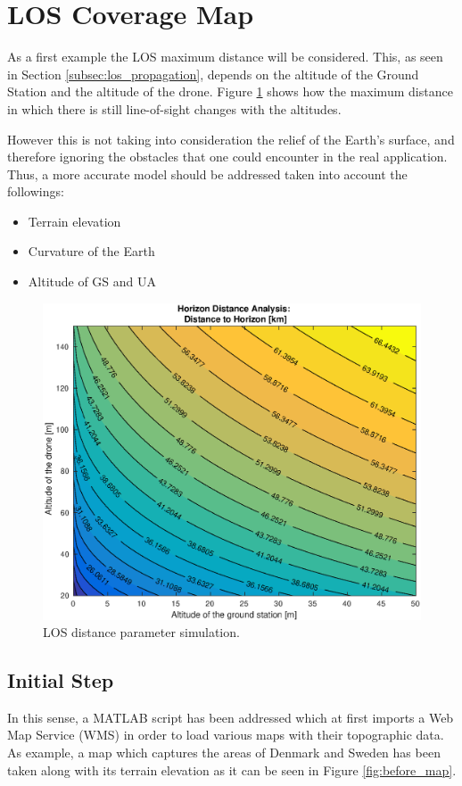 \section{LOS Coverage Map}\label{sec:los_map}
As a first example the LOS maximum distance will be considered. This, as seen in Section \ref{subsec:los_propagation}, depends on the altitude of the Ground Station and the altitude of the drone. Figure \ref{fig:altitude2distance} shows how the maximum distance in which there is still line-of-sight changes with the altitudes.

However this is not taking into consideration the relief of the Earth's surface, and therefore ignoring the obstacles that one could encounter in the real application. Thus, a more accurate model should be addressed taken into account the followings:

\begin{itemize}
  \item Terrain elevation
  \item Curvature of the Earth
  \item Altitude of GS and UA
\end{itemize}

\begin{figure}[H]
  \centering
  \includegraphics[scale=0.65]{figures/altitude2distance.eps}
  \caption{LOS distance parameter simulation.}
    \label{fig:altitude2distance}
\end{figure}

\subsection*{Initial Step}
In this sense, a MATLAB script has been addressed which at first imports a Web Map Service (WMS) in order to load various maps with their topographic data. As example, a map which captures the areas of Denmark and Sweden has been taken along with its terrain elevation as it can be seen in Figure \ref{fig:before_map}.

